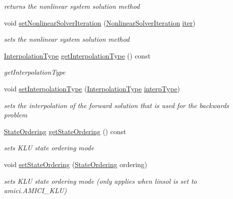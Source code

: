 \begin{DoxyCompactItemize}
\begin{DoxyCompactList}\small\item\em returns the nonlinear system solution method \end{DoxyCompactList}\item 
void \mbox{\hyperlink{classamici_1_1_solver_a1dc7983f545ee95f7e6fb38cfb0b3286}{set\+Nonlinear\+Solver\+Iteration}} (\mbox{\hyperlink{namespaceamici_a13388d34e4c35bb592c3e821c35cc923}{Nonlinear\+Solver\+Iteration}} \mbox{\hyperlink{classamici_1_1_solver_a0ef59d3f746d2ec0e3f126b7b9989f50}{iter}})
\begin{DoxyCompactList}\small\item\em sets the nonlinear system solution method \end{DoxyCompactList}\item 
\mbox{\hyperlink{namespaceamici_a8472f01c511d77bbfb981a46618ea1ea}{Interpolation\+Type}} \mbox{\hyperlink{classamici_1_1_solver_a69568ccb5de1bcdd4344e105ddb12324}{get\+Interpolation\+Type}} () const
\begin{DoxyCompactList}\small\item\em get\+Interpolation\+Type \end{DoxyCompactList}\item 
void \mbox{\hyperlink{classamici_1_1_solver_a9d9a0a5f8cdfdb993960706c646e240f}{set\+Interpolation\+Type}} (\mbox{\hyperlink{namespaceamici_a8472f01c511d77bbfb981a46618ea1ea}{Interpolation\+Type}} \mbox{\hyperlink{classamici_1_1_solver_a5a80193af5ca74a4a4e3da67a7e74a98}{interp\+Type}})
\begin{DoxyCompactList}\small\item\em sets the interpolation of the forward solution that is used for the backwards problem \end{DoxyCompactList}\item 
\mbox{\hyperlink{namespaceamici_a890d968060d6d830aeed98dbeb04447f}{State\+Ordering}} \mbox{\hyperlink{classamici_1_1_solver_ac758cf7c51f50db18ea58898623ce12c}{get\+State\+Ordering}} () const
\begin{DoxyCompactList}\small\item\em sets K\+LU state ordering mode \end{DoxyCompactList}\item 
void \mbox{\hyperlink{classamici_1_1_solver_aa22ae4579c350a6f3fae2e3b5a0da1de}{set\+State\+Ordering}} (\mbox{\hyperlink{namespaceamici_a890d968060d6d830aeed98dbeb04447f}{State\+Ordering}} ordering)
\begin{DoxyCompactList}\small\item\em sets K\+LU state ordering mode (only applies when linsol is set to amici.\+A\+M\+I\+C\+I\+\_\+\+K\+LU) \end{DoxyCompactList}\item 

\end{DoxyCompactItemize}
